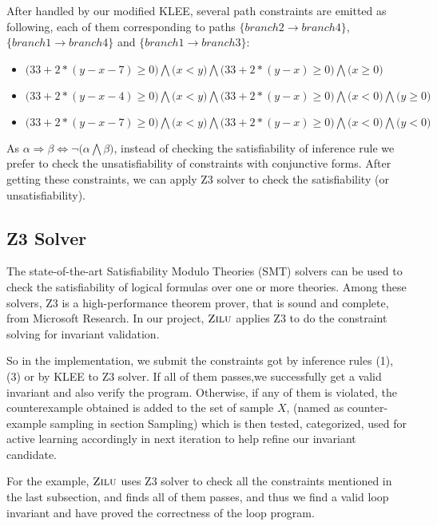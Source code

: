 After handled by our modified KLEE,
several path constraints are emitted as following, each of them corresponding to paths 
$\{branch2 \to branch4\}$, $\{branch1 \to branch4\}$ and $\{branch1 \to branch3\}$:


\begin{itemize}
\item $\big(33+2*(y-x-7)\ge0\big) \bigwedge \big(x<y\big) \bigwedge \big(33+2*(y-x)\ge0\big) \bigwedge \big(x\ge0\big)$
\item $\big(33+2*(y-x-4)\ge0\big) \bigwedge \big(x<y\big) \bigwedge \big(33+2*(y-x)\ge0\big) \bigwedge \big(x<0\big) \bigwedge \big(y\ge0\big)$
\item $\big(33+2*(y-x-7)\ge0\big) \bigwedge \big(x<y\big) \bigwedge \big(33+2*(y-x)\ge0\big) \bigwedge \big(x<0\big) \bigwedge \big(y<0\big)$
\end{itemize}
As $\alpha \Rightarrow \beta \Longleftrightarrow \neg \big(\alpha \bigwedge \beta\big)$, 
instead of checking the satisfiability of inference rule
we prefer to check the unsatisfiability of constraints with conjunctive forms. 
After getting these constraints, we can apply Z3 solver to check the satisfiability (or unsatisfiability).

\subsection{Z3 Solver}
The state-of-the-art Satisfiability Modulo Theories (SMT) solvers can be used to check the satisfiability of logical formulas over one or more theories. 
Among these solvers, Z3 is a high-performance theorem prover, that is sound and complete, from Microsoft Research.
In our project, $\textsc{Zilu}$ applies Z3 to do the constraint solving for invariant validation. 

So in the implementation, we submit the constraints got by inference rules (1), (3) or by KLEE to Z3 solver.
If all of them passes,we successfully get a valid invariant and also verify the program. 
Otherwise, if any of them is violated, the counterexample obtained is added to the set of sample $X$, 
(named as counter-example sampling in section Sampling)
which is then tested, categorized, used for active learning accordingly in next iteration to help refine our invariant candidate.

For the example, $\textsc{Zilu}$ uses Z3 solver to check all the constraints mentioned in the last subsection,
and finds all of them passes, and thus we find a valid loop invariant and have proved the correctness of the loop program.

